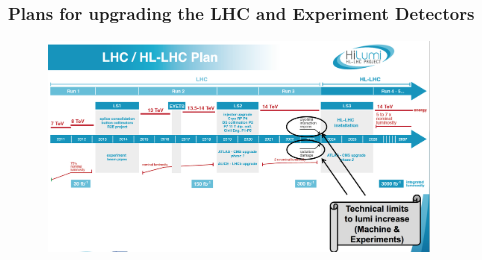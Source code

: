 \begin{frame}
\frametitle{Plans for upgrading the LHC and Experiment Detectors}

\begin{figure}[htbp]
\begin{center}
\includegraphics[width=0.9\textwidth]{images/20170202-rossi-hllhc-2.png}
\end{center}
\end{figure}


\end{frame}


